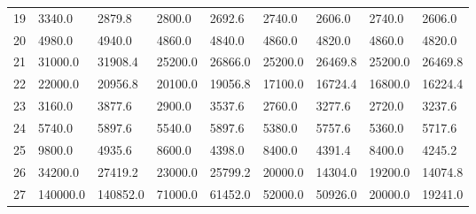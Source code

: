 \begin{tabular}{|r|l|l|l|l|l|l|l|l|}
  19 & 3340.0 & 2879.8 & 2800.0 & 2692.6 & 2740.0 & 2606.0 & 2740.0 & 2606.0 \\ 
  20 & 4980.0 & 4940.0 & 4860.0 & 4840.0 & 4860.0 & 4820.0 & 4860.0 & 4820.0 \\ 
  21 & 31000.0 & 31908.4 & 25200.0 & 26866.0 & 25200.0 & 26469.8 & 25200.0 & 26469.8 \\ 
  22 & 22000.0 & 20956.8 & 20100.0 & 19056.8 & 17100.0 & 16724.4 & 16800.0 & 16224.4 \\ 
  23 & 3160.0 & 3877.6 & 2900.0 & 3537.6 & 2760.0 & 3277.6 & 2720.0 & 3237.6 \\ 
  24 & 5740.0 & 5897.6 & 5540.0 & 5897.6 & 5380.0 & 5757.6 & 5360.0 & 5717.6 \\ 
  25 & 9800.0 & 4935.6 & 8600.0 & 4398.0 & 8400.0 & 4391.4 & 8400.0 & 4245.2 \\ 
  26 & 34200.0 & 27419.2 & 23000.0 & 25799.2 & 20000.0 & 14304.0 & 19200.0 & 14074.8 \\ 
  27 & 140000.0 & 140852.0 & 71000.0 & 61452.0 & 52000.0 & 50926.0 & 20000.0 & 19241.0 \\ 
\end{tabular}
